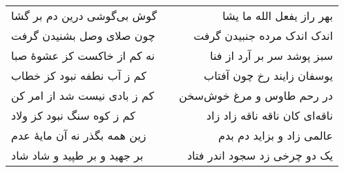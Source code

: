 \begin{center}
\begin{longtable}{l p{0.5cm} r}
گوش بی‌گوشی درین دم بر گشا
&&
بهر راز یفعل الله ما یشا
\\
چون صلای وصل بشنیدن گرفت
&&
اندک اندک مرده جنبیدن گرفت
\\
نه کم از خاکست کز عشوهٔ صبا
&&
سبز پوشد سر بر آرد از فنا
\\
کم ز آب نطفه نبود کز خطاب
&&
یوسفان زایند رخ چون آفتاب
\\
کم ز بادی نیست شد از امر کن
&&
در رحم طاوس و مرغ خوش‌سخن
\\
کم ز کوه سنگ نبود کز ولاد
&&
ناقه‌ای کان ناقه ناقه زاد زاد
\\
زین همه بگذر نه آن مایهٔ عدم
&&
عالمی زاد و بزاید دم بدم
\\
بر جهید و بر طپید و شاد شاد
&&
یک دو چرخی زد سجود اندر فتاد
\\
\end{longtable}
\end{center}
